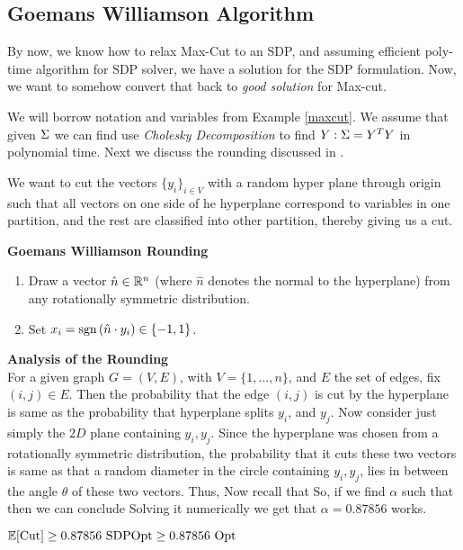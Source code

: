 \subsection{Goemans Williamson Algorithm}
By now, we know how to relax Max-Cut to an SDP, and assuming efficient poly-time algorithm for SDP solver, we have a solution for the SDP formulation. Now, we want to somehow convert that back to \textit{good solution} for Max-cut. 

We will borrow notation and variables from Example \ref{maxcut}.
We assume that given $\Sigma$ we can find use \emph{Cholesky Decomposition}  to find $Y : \Sigma = Y^T Y$ in polynomial time.
Next we discuss the rounding discussed in \cite{gwFirstMaxCutSDP}. 

We want to cut the vectors $\{y_i\}_{i \in V}$ with a random hyper plane through origin such that all vectors on one side of he hyperplane correspond to variables in one partition, and the rest are classified into other partition, thereby giving us a cut. 

\begin{algorithm}\textbf{Goemans Williamson Rounding}
\begin{enumerate}
\item Draw a vector $\hat{n} \in \mathbb{R}^n$ (where $\hat{n}$ denotes the normal to the hyperplane) from any rotationally symmetric distribution. 
\item Set $x_i = \mbox{sgn}\left(\hat{n} \cdot y_i\right) \in \{-1, 1 \}$.
\end{enumerate}
\end{algorithm}

{\bf Analysis of the Rounding} \\
For a given graph $G = (V, E)$, with $V =\{1, \ldots, n\}$, and $E$ the set of edges, fix $(i, j) \in E$. Then the probability that the edge $(i, j)$ is cut by the hyperplane is same as the probability that hyperplane splits $y_i$, and $y_j$. 
Now consider just simply the $2D$ plane containing $y_i, y_j$. Since the hyperplane was chosen from a rotationally symmetric distribution, the probability that it cuts these two vectors is same as that a random diameter in the circle containing $y_i, y_j$, lies in between the angle $\theta$ of these two vectors. Thus, 
Now recall that 
So, if we find $\alpha$ such that 
then we can conclude 
Solving it numerically we get that $\alpha = 0.87856$ works.
\begin{remark}
$\Ex[\mbox{Cut}]  \geq 0.87856 \mbox{\ SDPOpt} \geq 0.87856 \mbox{\ Opt }$
\end{remark} 
 
